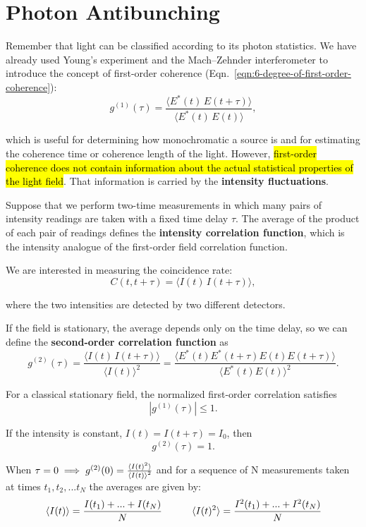 \section{Photon Antibunching}\label{sec:photon-antibunching}
Remember that light can be classified according to its photon statistics. We have already used Young's experiment and the Mach--Zehnder interferometer to introduce the concept of first-order coherence (Eqn.~\ref{eqn:6-degree-of-first-order-coherence}):
\begin{equation}
g^{(1)}(\tau)=\frac{\langle E^*(t)\,E(t+\tau)\rangle}{\langle E^*(t)\,E(t)\rangle},
\end{equation}

which is useful for determining how monochromatic a source is and for estimating the coherence time or coherence length of the light. However, \hl{first-order coherence does not contain information about the actual statistical properties of the light field}. That information is carried by the \textbf{intensity fluctuations}.

Suppose that we perform two-time measurements in which many pairs of intensity readings are taken with a fixed time delay $\tau$. The average of the product of each pair of readings defines the \textbf{intensity correlation function}, which is the intensity analogue of the first-order field correlation function.

We are interested in measuring the coincidence rate:
\[
C(t,t+\tau)=\langle I(t)\,I(t+\tau)\rangle,
\]

where the two intensities are detected by two different detectors.

If the field is stationary, the average depends only on the time delay, so we can define the \textbf{second-order correlation function} as
\begin{equation}\label{eqn:10-second-order-correlation-function}
g^{(2)}(\tau)=
\frac{\langle I(t)\,I(t+\tau)\rangle}{\langle I(t)\rangle^2} =
\frac{\langle E^*(t)E^*(t+\tau)E(t)E(t+\tau)\rangle}{\langle E^*(t)E(t)\rangle^2}.
\end{equation}

For a classical stationary field, the normalized first-order correlation satisfies
\[
|g^{(1)}(\tau)|\le 1.
\]

If the intensity is constant, $I(t)=I(t+\tau)=I_0$, then
\[
g^{(2)}(\tau)=1.
\]

When $\tau = 0 \implies g^{(2)}(0) = \frac{\braket{I(t)^2}}{\braket{I(t)}^2}$ and for a sequence of N measurements taken at times $t_1,t_2,...t_N$ the averages are given by:
\[\braket{I(t)} = \frac{I(t_1)+...+I(t_N)}{N}\hspace{1cm}\braket{I(t)^2} = \frac{I^2(t_1)+...+I^2(t_N)}{N}\]


